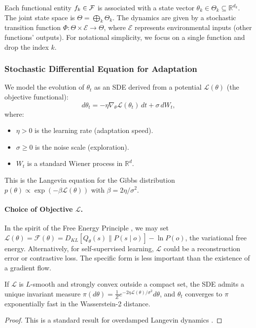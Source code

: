 \begin{definition}
Each functional entity $f_k \in \mathcal{F}$ is associated with a state vector $\theta_k \in \Theta_k \subseteq \mathbb{R}^{d_k}$. The joint state space is $\Theta = \bigoplus_k \Theta_k$. The dynamics are given by a stochastic transition function $\Phi: \Theta \times \mathcal{E} \to \Theta$, where $\mathcal{E}$ represents environmental inputs (other functions' outputs). For notational simplicity, we focus on a single function and drop the index $k$.
\end{definition}

\subsubsection{Stochastic Differential Equation for Adaptation}
We model the evolution of $\theta_t$ as an SDE derived from a potential $\mathcal{L}(\theta)$ (the objective functional):
\[
d\theta_t = -\eta \nabla_\theta \mathcal{L}(\theta_t) \, dt + \sigma \, dW_t,
\]
where:
\begin{itemize}
    \item $\eta > 0$ is the learning rate (adaptation speed).
    \item $\sigma \ge 0$ is the noise scale (exploration).
    \item $W_t$ is a standard Wiener process in $\mathbb{R}^d$.
\end{itemize}
This is the Langevin equation for the Gibbs distribution $p(\theta) \propto \exp(-\beta \mathcal{L}(\theta))$ with $\beta = 2\eta/\sigma^2$.

\paragraph{Choice of Objective $\mathcal{L}$.}
In the spirit of the Free Energy Principle \cite{friston2010}, we may set $\mathcal{L}(\theta) = \mathcal{F}(\theta) = D_{KL}[Q_\theta(s) \| P(s \mid o)] - \ln P(o)$, the variational free energy. Alternatively, for self-supervised learning, $\mathcal{L}$ could be a reconstruction error or contrastive loss. The specific form is less important than the existence of a gradient flow.

\begin{proposition}
If $\mathcal{L}$ is $L$-smooth and strongly convex outside a compact set, the SDE admits a unique invariant measure $\pi(d\theta) = \frac{1}{Z} e^{-2\eta \mathcal{L}(\theta)/\sigma^2} d\theta$, and $\theta_t$ converges to $\pi$ exponentially fast in the Wasserstein-2 distance.
\end{proposition}
\begin{proof}
This is a standard result for overdamped Langevin dynamics \cite{roberts1996exponential}.
\end{proof}

